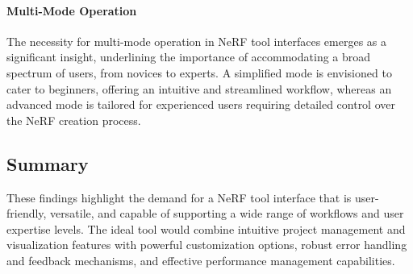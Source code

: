 \paragraph{Multi-Mode Operation}
The necessity for multi-mode operation in NeRF tool interfaces emerges as a significant insight, underlining the importance of accommodating a broad spectrum of users, from novices to experts. 
A simplified mode is envisioned to cater to beginners, offering an intuitive and streamlined workflow, whereas an advanced mode is tailored for experienced users requiring detailed control over the NeRF creation process. 
\cite{P1, P2, P3, P4}


\subsection*{Summary}

These findings highlight the demand for a NeRF tool interface that is user-friendly, versatile, and capable of supporting a wide range of workflows and user expertise levels. 
The ideal tool would combine intuitive project management and visualization features with powerful customization options, robust error handling and feedback mechanisms, and effective performance management capabilities.
